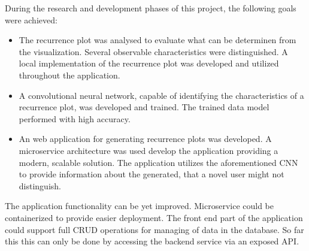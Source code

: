 During the research and development phases of this project, the following goals were achieved:
\begin{itemize}
    \item The recurrence plot was analysed to evaluate what can be determinen from the visualization. Several observable characteristics were distinguished. A local implementation of the recurrence plot was developed and utilized throughout the application.
    \item A convolutional neural network, capable of identifying the characteristics of a recurrence plot, was developed and trained. The trained data model performed with high accuracy.
    \item An web application for generating recurrence plots was developed. A microservice architecture was used develop the application providing a modern, scalable solution. The application utilizes the aforementioned CNN to provide information about the generated, that a novel user might not distinguish.
\end{itemize}

The application functionality can be yet improved. Microservice could be containerized to provide easier deployment. The front end part of the application could support full CRUD operations for managing of data in the database. So far this this can only be done by accessing the backend service via an exposed API.